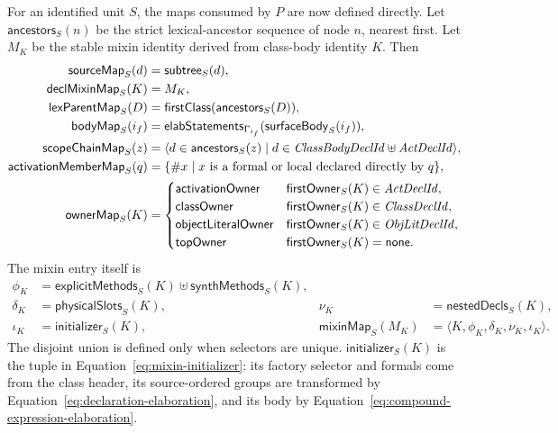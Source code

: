 For an identified unit $S$, the maps consumed by $P$ are now defined directly.
Let $\mathsf{ancestors}_{S}(n)$ be the strict lexical-ancestor sequence of
node $n$, nearest first.  Let $M_K$ be the stable mixin identity derived from
class-body identity $K$.  Then
\begin{equation}\label{eq:derived-program-indexes}
\begin{aligned}
 \mathsf{sourceMap}_{S}(d)&=\mathsf{subtree}_{S}(d),\\
 \mathsf{declMixinMap}_{S}(K)&=M_K,\\
 \mathsf{lexParentMap}_{S}(D)&=
   \mathsf{firstClass}(\mathsf{ancestors}_{S}(D)),\\
 \mathsf{bodyMap}_{S}(i_f)&=
   \mathsf{elabStatements}_{\Gamma_{i_f}}(\mathsf{surfaceBody}_{S}(i_f)),\\
 \mathsf{scopeChainMap}_{S}(z)&=
   \langle d\in\mathsf{ancestors}_{S}(z)\mid
      d\in\mathit{ClassBodyDeclId}\uplus\mathit{ActDeclId}\rangle,\\
 \mathsf{activationMemberMap}_{S}(q)&=
   \{\#x\mid x\text{ is a formal or local declared directly by }q\},\\
 \mathsf{ownerMap}_{S}(K)&=
  \begin{cases}
   \mathsf{activationOwner}&\mathsf{firstOwner}_{S}(K)\in\mathit{ActDeclId},\\
   \mathsf{classOwner}&\mathsf{firstOwner}_{S}(K)\in\mathit{ClassDeclId},\\
   \mathsf{objectLiteralOwner}&\mathsf{firstOwner}_{S}(K)\in\mathit{ObjLitDeclId},\\
   \mathsf{topOwner}&\mathsf{firstOwner}_{S}(K)=\mathsf{none}.
  \end{cases}
\end{aligned}
\end{equation}
The mixin entry itself is
\begin{equation}\label{eq:derived-mixin-entry}
\begin{aligned}
 \phi_K&=\mathsf{explicitMethods}_{S}(K)
          \uplus\mathsf{synthMethods}_{S}(K),\\
 \delta_K&=\mathsf{physicalSlots}_{S}(K),
 &\nu_K&=\mathsf{nestedDecls}_{S}(K),\\
 \iota_K&=\mathsf{initializer}_{S}(K),
 &\mathsf{mixinMap}_{S}(M_K)&=
   \langle K,\phi_K,\delta_K,\nu_K,\iota_K\rangle.
\end{aligned}
\end{equation}
The disjoint union is defined only when selectors are unique.
$\mathsf{initializer}_{S}(K)$ is the tuple in
Equation~\eqref{eq:mixin-initializer}: its factory selector and formals come
from the class header, its source-ordered groups are transformed by
Equation~\eqref{eq:declaration-elaboration}, and its body by
Equation~\eqref{eq:compound-expression-elaboration}.

